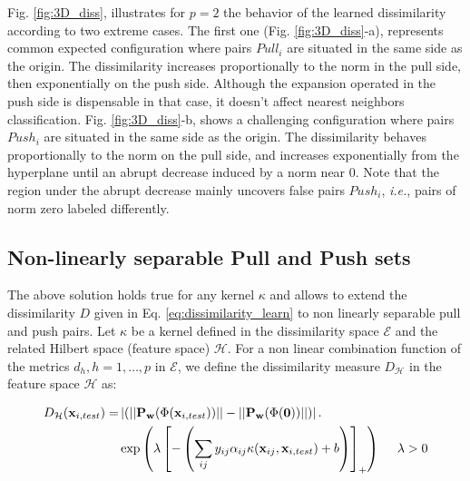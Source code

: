 Fig. \ref{fig:3D_diss}, illustrates for $p = 2$ the behavior of the learned dissimilarity according to two extreme cases. The first one (Fig. \ref{fig:3D_diss}-a), represents common expected configuration where pairs $Pull_i$ are situated in the same side as the origin. The dissimilarity increases proportionally to the norm in the pull side, then exponentially on the push side. Although the expansion operated in the push side is dispensable in that case, it doesn’t affect nearest neighbors classification. Fig. \ref{fig:3D_diss}-b, shows a challenging configuration where pairs $Push_i$ are situated in the same side as the origin. The dissimilarity behaves proportionally to the norm on the pull side, and increases exponentially from the hyperplane until an abrupt decrease induced by a norm near 0. Note that the region under the abrupt decrease mainly uncovers false pairs $Push_i$, \textit{i.e.}, pairs of norm zero labeled differently.

\subsection{Non-linearly separable Pull and Push sets}
The above solution holds true for any kernel $\kappa$ and allows to extend the dissimilarity $D$ given in Eq. \ref{eq:dissimilarity_learn} to non linearly separable pull and push pairs. Let $\kappa$ be a kernel defined in the dissimilarity space $\mathcal{E}$ and the related Hilbert space (feature space) $\mathcal{H}$. For a non linear combination function of the metrics $d_h, h = 1,\ldots,p$ in $\mathcal{E}$, we define the dissimilarity measure $D_\mathcal{H}$ in the feature space $\mathcal{H}$ as:

\begin{equation}
\begin{aligned}
D_\mathcal{H}(\textbf{x}_{i,test}) = 
& \left| (||\textbf{P}_\textbf{w}(\Phi(\textbf{x}_{i,test}))||-||\textbf{P}_\textbf{w}(\Phi(\textbf{0}))||) \right|   . \\
& \exp\left( \lambda \left[  -\left( \sum_{ij}y_{ij} \alpha_{ij} \kappa(\textbf{x}_{ij},\textbf{x}_{i,test}) + b \right)  \right] _+\right) 
\text{ \quad  } \lambda > 0
\label{eq:dissimilarity_learn_NonLinear}
\end{aligned}
\end{equation}

